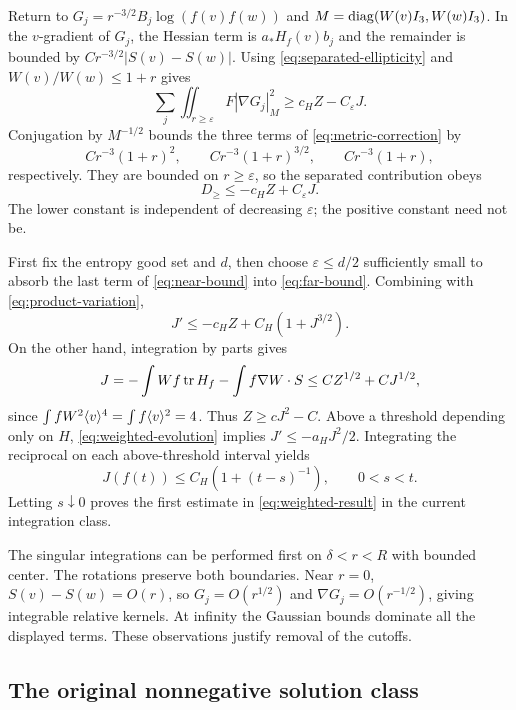 Return to $G_j=r^{-3/2}B_j\log(f(v)f(w))$ and $M=\operatorname{diag}(W(v)I_3,W(w)I_3)$. In the $v$-gradient of $G_j$, the Hessian term is $a_*H_f(v)b_j$ and the remainder is bounded by $Cr^{-3/2}|S(v)-S(w)|$. Using \eqref{eq:separated-ellipticity} and $W(v)/W(w)\le1+r$ gives
\[
 \sum_j\iint_{r\ge\varepsilon}F|\nabla G_j|_M^2
 \ge c_H Z-C_\varepsilon J.
\]
Conjugation by $M^{-1/2}$ bounds the three terms of \eqref{eq:metric-correction} by
\[
 Cr^{-3}(1+r)^2,\qquad Cr^{-3}(1+r)^{3/2},\qquad Cr^{-3}(1+r),
\]
respectively. They are bounded on $r\ge\varepsilon$, so the separated contribution obeys
\begin{equation}\label{eq:far-bound}
 D_\ge\le-c_H Z+C_\varepsilon J.
\end{equation}
The lower constant is independent of decreasing $\varepsilon$; the positive constant need not be.

First fix the entropy good set and $d$, then choose $\varepsilon\le d/2$ sufficiently small to absorb the last term of \eqref{eq:near-bound} into \eqref{eq:far-bound}. Combining with \eqref{eq:product-variation},
\begin{equation}\label{eq:weighted-evolution}
 J'\le-c_HZ+C_H(1+J^{3/2}).
\end{equation}
On the other hand, integration by parts gives
\[
 J=-\int Wf\operatorname{tr} H_f-\int f\nabla W\cdot S
 \le C Z^{1/2}+C J^{1/2},
\]
since $\int fW^2\langle v\rangle^4=\int f\langle v\rangle^2=4$. Thus $Z\ge cJ^2-C$. Above a threshold depending only on $H$, \eqref{eq:weighted-evolution} implies $J'\le-a_HJ^2/2$. Integrating the reciprocal on each above-threshold interval yields
\begin{equation}\label{eq:J-gaussian}
 J(f(t))\le C_H(1+(t-s)^{-1}),\qquad 0<s<t.
\end{equation}
Letting $s\downarrow0$ proves the first estimate in \eqref{eq:weighted-result} in the current integration class.

The singular integrations can be performed first on $\delta<r<R$ with bounded center. The rotations preserve both boundaries. Near $r=0$, $S(v)-S(w)=O(r)$, so $G_j=O(r^{1/2})$ and $\nabla G_j=O(r^{-1/2})$, giving integrable relative kernels. At infinity the Gaussian bounds dominate all the displayed terms. These observations justify removal of the cutoffs.

\subsection{The original nonnegative solution class}

